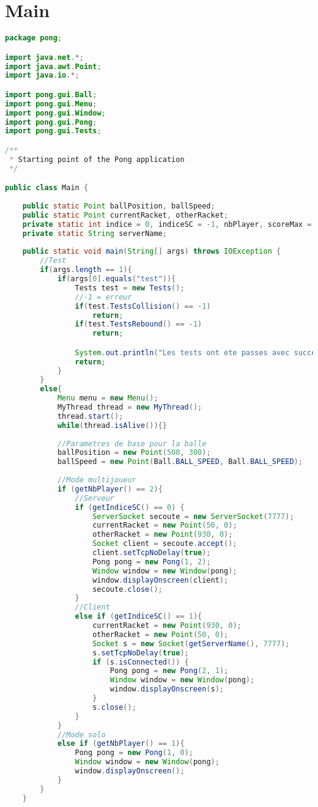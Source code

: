 \section{Main}
\begin{lstlisting}[language=Java]
package pong;

import java.net.*;
import java.awt.Point;
import java.io.*;

import pong.gui.Ball;
import pong.gui.Menu;
import pong.gui.Window;
import pong.gui.Pong;
import pong.gui.Tests;

/**
 * Starting point of the Pong application
 */

public class Main {
	
	public static Point ballPosition, ballSpeed;
	public static Point currentRacket, otherRacket;
	private static int indice = 0, indiceSC = -1, nbPlayer, scoreMax = 15;
	private static String serverName;
	
	public static void main(String[] args) throws IOException {
		//Test
		if(args.length == 1){
			if(args[0].equals("test")){
				Tests test = new Tests();
				//-1 = erreur
				if(test.TestsCollision() == -1)
					return;
				if(test.TestsRebound() == -1)
					return;

				System.out.println("Les tests ont ete passes avec succes");
				return;
			}
		}
		else{
			Menu menu = new Menu();
			MyThread thread = new MyThread(); 
			thread.start();
			while(thread.isAlive()){}
			
			//Parametres de base pour la balle
			ballPosition = new Point(500, 300); 
			ballSpeed = new Point(Ball.BALL_SPEED, Ball.BALL_SPEED);
			
			//Mode multijoueur
			if (getNbPlayer() == 2){
				//Serveur
				if (getIndiceSC() == 0) {
					ServerSocket secoute = new ServerSocket(7777);
					currentRacket = new Point(50, 0);
					otherRacket = new Point(930, 0);
					Socket client = secoute.accept();
					client.setTcpNoDelay(true);
					Pong pong = new Pong(1, 2); 
					Window window = new Window(pong);
					window.displayOnscreen(client);
					secoute.close();
				}
				//Client
				else if (getIndiceSC() == 1){
					currentRacket = new Point(930, 0);
					otherRacket = new Point(50, 0);
					Socket s = new Socket(getServerName(), 7777);
					s.setTcpNoDelay(true);
					if (s.isConnected()) {
						Pong pong = new Pong(2, 1);
						Window window = new Window(pong);
						window.displayOnscreen(s);
					}
					s.close();
				}
			}
			//Mode solo
			else if (getNbPlayer() == 1){
				Pong pong = new Pong(1, 0);
				Window window = new Window(pong);
				window.displayOnscreen();
			}
		}
	}
	

\end{lstlisting}
